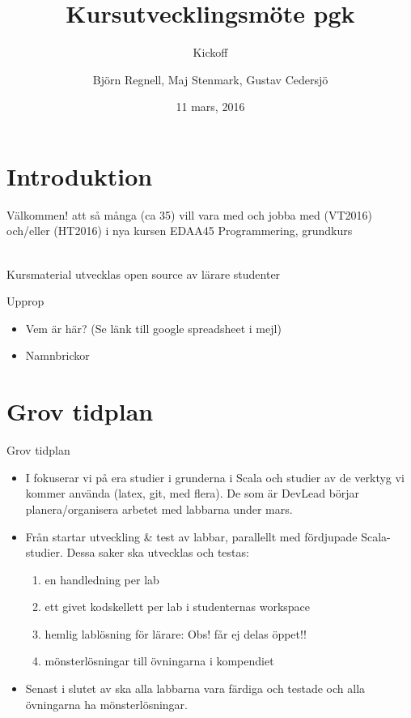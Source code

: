 \documentclass{slides}
\title[Kursutvecklingsmöte pgk]{Kursutvecklingsmöte pgk}
\subtitle{Kickoff}
\author{Björn Regnell, Maj Stenmark, Gustav Cedersjö}
\institute{Datavetenskap, LTH}
\date{11 mars, 2016}
\begin{document}
\frame{\titlepage}

\section{Introduktion}
\begin{Slide}{Välkommen!}
 att så många (ca 35) vill vara med och jobba med  (VT2016) och/eller  (HT2016) i nya kursen EDAA45 Programmering, grundkurs 

\vspace{2em}
\\ Kursmaterial utvecklas open source av lärare  studenter 
\end{Slide}

\begin{Slide}{Upprop}
\begin{itemize}
\item Vem är här? (Se länk till google spreadsheet i mejl)
\item Namnbrickor
\end{itemize}
\end{Slide}

\section{Grov tidplan}

\begin{Slide}{Grov tidplan}
\begin{itemize}
\item I  fokuserar vi på era studier i grunderna i Scala och studier av de verktyg vi kommer använda (latex, git, med flera). De som är DevLead börjar planera/organisera arbetet med labbarna under mars.

\item Från  startar utveckling \& test av labbar, parallellt med fördjupade Scala-studier. Dessa saker ska utvecklas och testas:
\begin{enumerate}
\item en handledning per lab
\item ett givet kodskellett per lab i studenternas workspace
\item hemlig lablösning för lärare: Obs! får ej delas öppet!!
\item mönsterlösningar till övningarna i kompendiet
\end{enumerate}

\item Senast i slutet av  ska alla labbarna vara färdiga och testade och alla övningarna ha mönsterlösningar.
\end{itemize}
\end{Slide}
\end{document}
